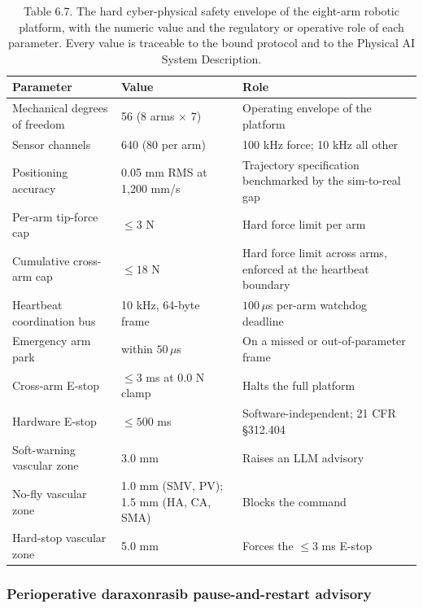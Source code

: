 \begin{table}[t]
\caption{Table 6.7. The hard cyber-physical safety envelope of the eight-arm robotic
platform, with the numeric value and the regulatory or operative role of each
parameter. Every value is traceable to the bound protocol and to the Physical AI
System Description.}
\label{tab:sec06-envelope}
\centering
\begin{tabularx}{\textwidth}{L{4.6cm} L{3.9cm} Y}
\toprule
\textbf{Parameter} & \textbf{Value} & \textbf{Role} \\
\midrule
Mechanical degrees of freedom & 56 (8 arms $\times$ 7) & Operating envelope of the platform \\
Sensor channels & 640 (80 per arm) & 100 kHz force; 10 kHz all other \\
Positioning accuracy & 0.05 mm RMS at 1,200 mm/s & Trajectory specification benchmarked by the sim-to-real gap \\
Per-arm tip-force cap & $\leq 3$ N & Hard force limit per arm \\
Cumulative cross-arm cap & $\leq 18$ N & Hard force limit across arms, enforced at the heartbeat boundary \\
Heartbeat coordination bus & 10 kHz, 64-byte frame & $100\,\mu$s per-arm watchdog deadline \\
Emergency arm park & within $50\,\mu$s & On a missed or out-of-parameter frame \\
Cross-arm E-stop & $\leq 3$ ms at 0.0 N clamp & Halts the full platform \\
Hardware E-stop & $\leq 500$ ms & Software-independent; 21 CFR \S 312.404 \\
Soft-warning vascular zone & 3.0 mm & Raises an LLM advisory \\
No-fly vascular zone & 1.0 mm (SMV, PV); 1.5 mm (HA, CA, SMA) & Blocks the command \\
Hard-stop vascular zone & 5.0 mm & Forces the $\leq 3$ ms E-stop \\
\bottomrule
\end{tabularx}
\end{table}

\subsubsection*{Perioperative daraxonrasib pause-and-restart advisory}

